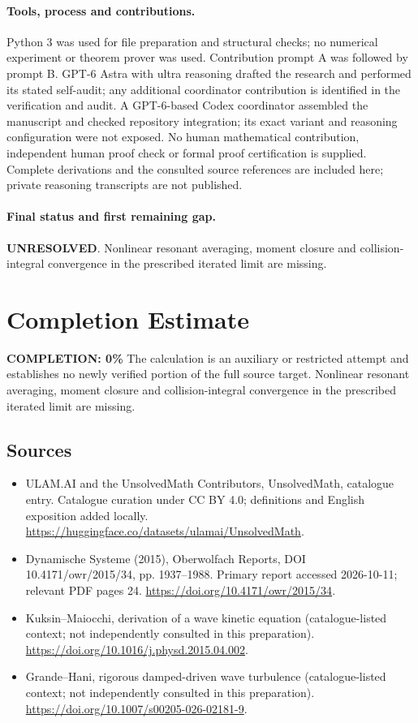 \documentclass[11pt]{article}
\begin{document}
\paragraph{Tools, process and contributions.}
Python 3 was used for file preparation and structural checks; no numerical experiment or theorem prover was used. Contribution prompt A was followed by prompt B. GPT-6 Astra with ultra reasoning drafted the research and performed its stated self-audit; any additional coordinator contribution is identified in the verification and audit. A GPT-6-based Codex coordinator assembled the manuscript and checked repository integration; its exact variant and reasoning configuration were not exposed. No human mathematical contribution, independent human proof check or formal proof certification is supplied. Complete derivations and the consulted source references are included here; private reasoning transcripts are not published.

\paragraph{Final status and first remaining gap.}
\textbf{UNRESOLVED}. Nonlinear resonant averaging, moment closure and collision-integral convergence in the prescribed iterated limit are missing.

\section{Completion Estimate}
\noindent\textbf{COMPLETION: 0\%}
The calculation is an auxiliary or restricted attempt and establishes no newly verified portion of the full source target. Nonlinear resonant averaging, moment closure and collision-integral convergence in the prescribed iterated limit are missing.

\subsection{Sources}
\begin{itemize}
\item[\hypertarget{source:statement:1}{S1}] ULAM.AI and the UnsolvedMath Contributors, UnsolvedMath, catalogue entry. Catalogue curation under CC BY 4.0; definitions and English exposition added locally.
\url{https://huggingface.co/datasets/ulamai/UnsolvedMath}.
\item[\hypertarget{source:statement:2}{S2}] Dynamische Systeme (2015), Oberwolfach Reports, DOI 10.4171/owr/2015/34, pp. 1937--1988. Primary report accessed 2026-10-11; relevant PDF pages 24.
\url{https://doi.org/10.4171/owr/2015/34}.
\item[\hypertarget{source:statement:3}{S3}] Kuksin--Maiocchi, derivation of a wave kinetic equation (catalogue-listed context; not independently consulted in this preparation).
\url{https://doi.org/10.1016/j.physd.2015.04.002}.
\item[\hypertarget{source:statement:4}{S4}] Grande--Hani, rigorous damped-driven wave turbulence (catalogue-listed context; not independently consulted in this preparation).
\url{https://doi.org/10.1007/s00205-026-02181-9}.
\end{itemize}
\label{end:statement}
\end{document}
